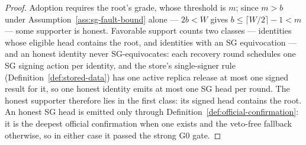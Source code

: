 \begin{proof}
Adoption requires the root's grade, whose threshold is \(m\); since
\(m>b\) under Assumption~\ref{ass:sg-fault-bound} alone ---
\(2b<W\) gives \(b\leq\lceil W/2\rceil-1<m\) --- some supporter
is honest.
Favorable support counts two classes --- identities whose eligible head
contains the root, and identities with an SG equivocation --- and an
honest identity never SG-equivocates: each recovery round schedules one
SG signing action per identity, and the store's single-signer rule
(Definition~\ref{def:stored-data}) has one active replica release at
most one signed result for it, so one honest identity emits at most one
SG head per round.  The honest supporter therefore lies in
the first class: its signed head contains the root.  An
honest SG head is emitted only through
Definition~\ref{def:official-confirmation}: it is the deepest official
confirmation when one exists and the veto-free fallback otherwise, so in
either case it passed the strong G0 gate.
\end{proof}

